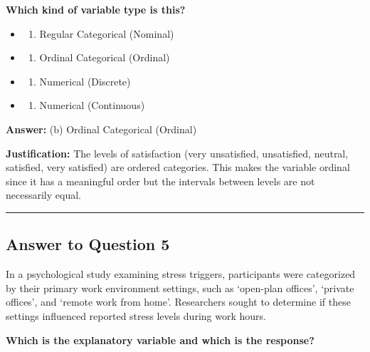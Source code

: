 \documentclass[
  11pt,
]{article}
\providecommand{\tightlist}{%
  \setlength{\itemsep}{0pt}\setlength{\parskip}{0pt}}
\begin{document}
\textbf{Which kind of variable type is this?}

\begin{itemize}
\tightlist
\item
  \begin{enumerate}
  \def\labelenumi{(\alph{enumi})}
  \tightlist
  \item
    Regular Categorical (Nominal)
  \end{enumerate}
\item
  \begin{enumerate}
  \def\labelenumi{(\alph{enumi})}
  \setcounter{enumi}{1}
  \tightlist
  \item
    Ordinal Categorical (Ordinal)
  \end{enumerate}
\item
  \begin{enumerate}
  \def\labelenumi{(\alph{enumi})}
  \setcounter{enumi}{2}
  \tightlist
  \item
    Numerical (Discrete)
  \end{enumerate}
\item
  \begin{enumerate}
  \def\labelenumi{(\alph{enumi})}
  \setcounter{enumi}{3}
  \tightlist
  \item
    Numerical (Continuous)
  \end{enumerate}
\end{itemize}

\textbf{Answer:} (b) Ordinal Categorical (Ordinal)

\textbf{Justification:} The levels of satisfaction (very unsatisfied,
unsatisfied, neutral, satisfied, very satisfied) are ordered categories.
This makes the variable ordinal since it has a meaningful order but the
intervals between levels are not necessarily equal.

\hrule

\subsection{Answer to Question 5}\label{answer-to-question-5}

In a psychological study examining stress triggers, participants were
categorized by their primary work environment settings, such as
`open-plan offices', `private offices', and `remote work from home'.
Researchers sought to determine if these settings influenced reported
stress levels during work hours.

\textbf{Which is the explanatory variable and which is the response?}
\end{document}
